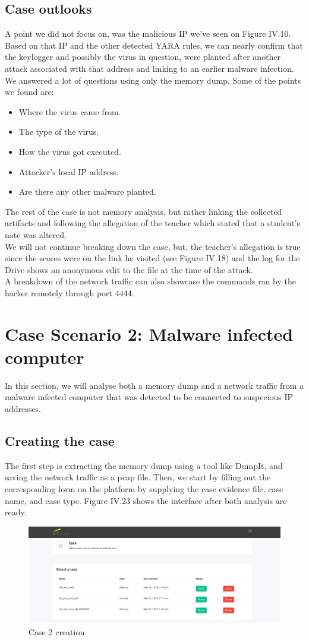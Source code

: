 \subsection{Case outlooks}
A point we did not focus on, was the malicious IP we've seen on Figure IV.10. Based on that IP and the other detected YARA rules, we can nearly confirm that the keylogger and possibly the virus in question, were planted after another attack associated with that address and linking to an earlier malware infection. We answered a lot of questions using only the memory dump. Some of the points we found are:
\begin{itemize}
    \item Where the virus came from.
    \item The type of the virus.
    \item How the virus got executed.
    \item Attacker's local IP address.
    \item Are there any other malware planted.
\end{itemize}
The rest of the case is not memory analysis, but rather linking the collected artifacts and following the allegation of the teacher which stated that a student's note was altered.\\
We will not continue breaking down the case, but, the teacher's allegation is true since the scores were on the link he visited (see Figure IV.18) and the log for the Drive shows an anonymous edit to the file at the time of the attack.\\
A breakdown of the network traffic can also showcase the commands ran by the hacker remotely through port 4444.\\

\section{Case Scenario 2: Malware infected computer}
In this section, we will analyse both a memory dump and a network traffic from a malware infected computer that was detected to be connected to suspecious IP addresses.
\subsection{Creating the case}
The first step is extracting the memory dump using a tool like DumpIt, and saving the network traffic as a pcap file. Then, we start by filling out the corresponding form on the platform by supplying the case evidence file, case name, and case type. Figure IV.23 shows the interface after both analysis are ready.
\begin{figure}[H]
\centering
\includegraphics[width=0.9\columnwidth]{Figures/23.png}
\caption{Case 2 creation}
\end{figure}
